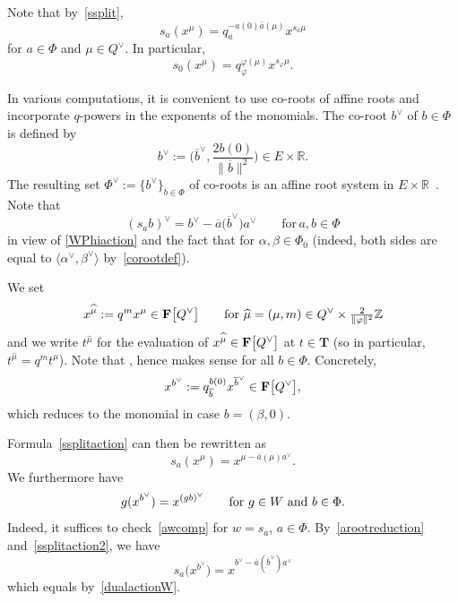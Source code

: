 \documentclass[pdftex]{sigma}
\numberwithin{equation}{section}
\begin{document}
Note that by~\eqref{ssplit},
\begin{equation}\label{ssplitaction}
s_a(x^\mu)=q_{\overline{a}}^{-a(0)\overline{a}(\mu)}x^{s_{\overline{a}}\mu}
\end{equation}
for $a\in\Phi$ and $\mu\in Q^\vee$. In particular,
\begin{equation*}%
s_0(x^\mu)=q_\varphi^{\varphi(\mu)}x^{s_\varphi\mu}.
\end{equation*}

In various computations, it is convenient to use co-roots of affine roots and incorporate $q$-powers in the exponents of the monomials. The co-root $b^\vee$ of $b\in\Phi$ is defined by
\[
b^\vee:=\biggl(\overline{b}^\vee,\frac{2b(0)}{\|\overline{b}\|^2}\biggr)\in E\times\mathbb{R}.
\]
The resulting set $\Phi^\vee:=\{b^\vee\}_{b\in\Phi}$ of co-roots is an affine root system in $E\times\mathbb{R}$~\cite{MacAff}. Note that
\begin{equation}\label{dualactionW}
(s_ab)^\vee=b^\vee-\overline{a}\bigl(\overline{b}^\vee\bigr)a^\vee\qquad \text{for}\, a,b\in\Phi
\end{equation}
in view of
\eqref{WPhiaction} and the fact that  for $\alpha,\beta\in\Phi_0$ (indeed, both sides are equal to $\langle\alpha^\vee,\beta^\vee\rangle$ by~\eqref{corootdef}).

We set
\[
x^{\widehat{\mu}}:=q^mx^\mu\in\mathbf{F}\smash{\bigl[Q^\vee\bigr]}\qquad\textup{for}\ \widehat{\mu}=(\mu,m)\in Q^\vee\times \tfrac{2}{\|\varphi\|^2}\mathbb{Z}
\]
and we write $t^{\widehat{\mu}}$ for the evaluation of $x^{\widehat{\mu}}\in\mathbf{F}\smash{\bigl[Q^\vee\bigr]}$ at $t\in\mathbf{T}$ \big(so in particular, $t^{\widehat{\mu}}=q^mt^\mu$\big).
Note that , hence  makes sense for all $b\in\Phi$. Concretely,
\begin{equation}\label{arootreduction}
x^{b^\vee}:=q_{\overline{b}}^{b(0)}x^{\overline{b}^\vee}\in\mathbf{F}\smash{\bigl[Q^\vee\bigr]},
\end{equation}
which reduces to the monomial  in case $b=(\beta,0)$.

Formula~\eqref{ssplitaction} can then be rewritten as
\begin{equation}\label{ssplitaction2}
s_a(x^\mu)=x^{\mu-\overline{a}(\mu)a^\vee}.
\end{equation}
We furthermore have
\begin{equation}\label{awcomp}
g(x^{b^\vee})=x^{(gb)^\vee}\qquad \textup{for}\ g\in W\ \text{and}\ b\in\Phi.
\end{equation}
Indeed, it suffices to check~\eqref{awcomp} for $w=s_a$, $a\in\Phi$. By~\eqref{arootreduction} and~\eqref{ssplitaction2}, we have
\[
s_a\bigl(x^{b^\vee}\bigr)=x^{b^\vee-\overline{a}(\overline{b}^\vee)a^\vee}
\]
which equals  by~\eqref{dualactionW}.
\end{document}
